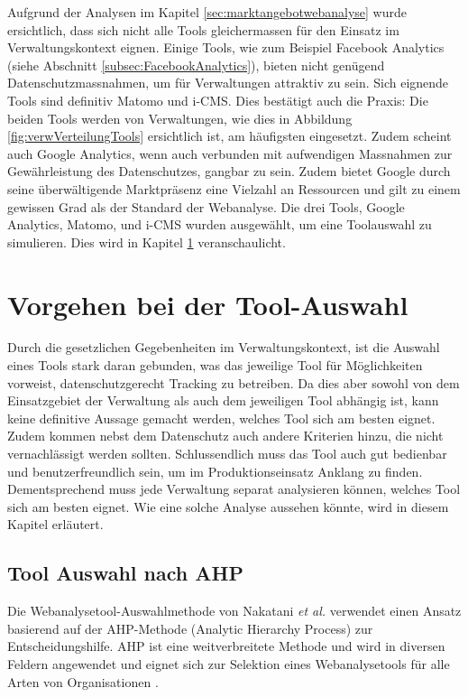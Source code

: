 Aufgrund der Analysen im Kapitel \ref{sec:marktangebotwebanalyse} wurde ersichtlich, dass sich nicht alle Tools gleichermassen für den Einsatz im Verwaltungskontext eignen. Einige Tools, wie zum Beispiel Facebook Analytics (siehe Abschnitt \ref{subsec:FacebookAnalytics}), bieten nicht genügend Datenschutzmassnahmen, um für Verwaltungen attraktiv zu sein. Sich eignende Tools sind definitiv Matomo und i-CMS. Dies bestätigt auch die Praxis: Die beiden Tools werden von Verwaltungen, wie dies in Abbildung \ref{fig:verwVerteilungTools} ersichtlich ist, am häufigsten eingesetzt. Zudem scheint auch Google Analytics, wenn auch verbunden mit aufwendigen Massnahmen zur Gewährleistung des Datenschutzes, gangbar zu sein. Zudem bietet Google durch seine überwältigende Marktpräsenz eine Vielzahl an Ressourcen und gilt zu einem gewissen Grad als der Standard der Webanalyse. Die drei Tools, Google Analytics, Matomo, und i-CMS wurden ausgewählt, um eine Toolauswahl zu simulieren. Dies wird in Kapitel \ref{sec:toolsel} veranschaulicht.

\newpage

\section{Vorgehen bei der Tool-Auswahl} \label{sec:toolsel}

Durch die gesetzlichen Gegebenheiten im Verwaltungskontext, ist die Auswahl eines Tools stark daran gebunden, was das jeweilige Tool für Möglichkeiten vorweist, datenschutzgerecht Tracking zu betreiben. Da dies aber sowohl von dem Einsatzgebiet der Verwaltung als auch dem jeweiligen Tool abhängig ist, kann keine definitive Aussage gemacht werden, welches Tool sich am besten eignet. Zudem kommen nebst dem Datenschutz auch andere Kriterien hinzu, die nicht vernachlässigt werden sollten. Schlussendlich muss das Tool auch gut bedienbar und benutzerfreundlich sein, um im Produktionseinsatz Anklang zu finden. Dementsprechend muss jede Verwaltung separat analysieren können, welches Tool sich am besten eignet. Wie eine solche Analyse aussehen könnte, wird in diesem Kapitel erläutert. 

\subsection{Tool Auswahl nach AHP} \label{subsec:toolauswAHP}

Die Webanalysetool-Auswahlmethode von Nakatani \textit{et al.} \parencite{nakatani2011toolselectionmethod} verwendet einen Ansatz basierend auf der AHP-Methode (Analytic Hierarchy Process) zur Entscheidungshilfe. AHP ist eine weitverbreitete Methode und wird in diversen Feldern angewendet und eignet sich zur Selektion eines Webanalysetools für alle Arten von Organisationen \parencite[S. 176]{nakatani2011toolselectionmethod}. 

